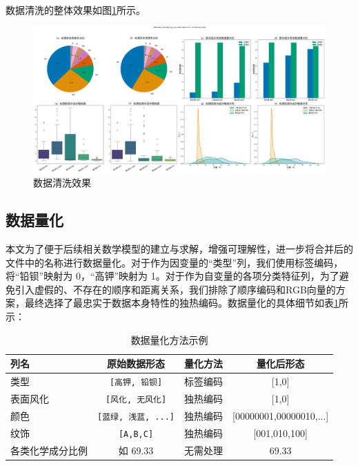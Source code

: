 数据清洗的整体效果如图\ref{fig:数据清洗效果}所示。
\begin{figure}[htbp]
	\centering
	\includegraphics[width=\textwidth]{figs/2模型准备/预处理效果.png}
	\caption{数据清洗效果}
	\label{fig:数据清洗效果}
\end{figure}


\subsection{数据量化}

本文为了便于后续相关数学模型的建立与求解，增强可理解性，进一步将合并后的文件中的名称进行数据量化。对于作为因变量的“类型”列，我们使用标签编码，将“铅钡”映射为 0，“高钾”映射为 1。对于作为自变量的各项分类特征列，为了避免引入虚假的、不存在的顺序和距离关系，我们排除了顺序编码和RGB向量的方案，最终选择了最忠实于数据本身特性的独热编码。数据量化的具体细节如表\ref{tab:quantification_example}所示：
\begin{table}[h!]
	\centering
	\caption{数据量化方法示例}
	\label{tab:quantification_example}
	\renewcommand{\arraystretch}{1.5} %
	\begin{tabular}{lccc}
		\toprule
		\textbf{列名} & \textbf{原始数据形态}               & \textbf{量化方法} & \textbf{量化后形态}                                \\
		\midrule
		\rowcolor{gray!20}
		类型          & \texttt{[高钾, 铅钡]}         & 标签编码          & [1,0]                        \\
		表面风化        & \texttt{[风化, 无风化]}        & 独热编码          & [1,0] \\
		\rowcolor{gray!20}
		颜色          & \texttt{[蓝绿, 浅蓝, ...]}    & 独热编码          & [00000001,00000010,...] \\
		纹饰          & \texttt{[A,B,C]} & 独热编码          & [001,010,100] \\
				\rowcolor{gray!20}
		各类化学成分比例    & 如 69.33                       & 无需处理          & 69.33                                         \\
		\bottomrule
	\end{tabular}
\end{table}

